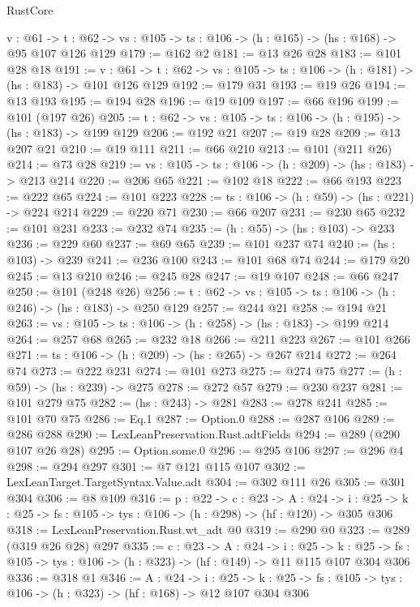 \begin{lexlean}{RustCore}
\begin{coremodule}
  {v : @61} ->
  {t : @62} -> {vs : @105} -> {ts : @106} -> (h : @165) -> (hs : @168) -> @95 @107 @126 @129
@179 := @162 @2
@181 := @13 @26 @28
@183 := @101 @28 @18
@191 := {v : @61} ->
  {t : @62} -> {vs : @105} -> {ts : @106} -> (h : @181) -> (hs : @183) -> @101 @126 @129
@192 := @179 @31
@193 := @19 @26
@194 := @13 @193
@195 := @194 @28
@196 := @19 @109
@197 := @66 @196
@199 := @101 (@197 @26)
@205 := {t : @62} -> {vs : @105} -> {ts : @106} -> (h : @195) -> (hs : @183) -> @199 @129
@206 := @192 @21
@207 := @19 @28
@209 := @13 @207 @21
@210 := @19 @111
@211 := @66 @210
@213 := @101 (@211 @26)
@214 := @73 @28
@219 := {vs : @105} -> {ts : @106} -> (h : @209) -> (hs : @183) -> @213 @214
@220 := @206 @65
@221 := @102 @18
@222 := @66 @193
@223 := @222 @65
@224 := @101 @223
@228 := {ts : @106} -> (h : @59) -> (hs : @221) -> @224 @214
@229 := @220 @71
@230 := @66 @207
@231 := @230 @65
@232 := @101 @231
@233 := @232 @74
@235 := (h : @55) -> (hs : @103) -> @233
@236 := @229 @60
@237 := @69 @65
@239 := @101 @237 @74
@240 := (hs : @103) -> @239
@241 := @236 @100
@243 := @101 @68 @74
@244 := @179 @20
@245 := @13 @210
@246 := @245 @28
@247 := @19 @107
@248 := @66 @247
@250 := @101 (@248 @26)
@256 := {t : @62} -> {vs : @105} -> {ts : @106} -> (h : @246) -> (hs : @183) -> @250 @129
@257 := @244 @21
@258 := @194 @21
@263 := {vs : @105} -> {ts : @106} -> (h : @258) -> (hs : @183) -> @199 @214
@264 := @257 @68
@265 := @232 @18
@266 := @211 @223
@267 := @101 @266
@271 := {ts : @106} -> (h : @209) -> (hs : @265) -> @267 @214
@272 := @264 @74
@273 := @222 @231
@274 := @101 @273
@275 := @274 @75
@277 := (h : @59) -> (hs : @239) -> @275
@278 := @272 @57
@279 := @230 @237
@281 := @101 @279 @75
@282 := (hs : @243) -> @281
@283 := @278 @241
@285 := @101 @70 @75
@286 := Eq.{1}
@287 := Option.{0}
@288 := @287 @106
@289 := @286 @288
@290 := LexLeanPreservation.Rust.adtFields
@294 := @289 (@290 @107 @26 @28)
@295 := Option.some.{0}
@296 := @295 @106
@297 := @296 @4
@298 := @294 @297
@301 := @7 @121 @115 @107
@302 := LexLeanTarget.TargetSyntax.Value.adt
@304 := @302 @111 @26
@305 := @301 @304
@306 := @8 @109
@316 := {p : @22} ->
  {c : @23} ->
  {A : @24} ->
  {i : @25} -> {k : @25} -> {fs : @105} -> {tys : @106} -> (h : @298) -> (hf : @120) -> @305 @306
@318 := LexLeanPreservation.Rust.wt_adt @0
@319 := @290 @0
@323 := @289 (@319 @26 @28) @297
@335 := {c : @23} ->
  {A : @24} ->
  {i : @25} ->
  {k : @25} -> {fs : @105} -> {tys : @106} -> (h : @323) -> (hf : @149) -> @11 @115 @107 @304 @306
@336 := @318 @1
@346 := {A : @24} ->
  {i : @25} ->
  {k : @25} -> {fs : @105} -> {tys : @106} -> (h : @323) -> (hf : @168) -> @12 @107 @304 @306

\end{coremodule}
\end{lexlean}
